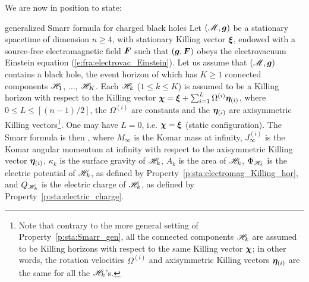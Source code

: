 We are now in position to state:

\begin{tprop}{generalized Smarr formula for charged black holes}{}
Let $(\mathscr{M},\bm{g})$ be a stationary spacetime of dimension $n\geq 4$, with stationary
Killing vector $\bm{\xi}$, endowed with a source-free electromagnetic field
$\bm{F}$ such that $(\bm{g},\bm{F})$ obeys the electrovacuum Einstein equation
(\ref{e:fra:electrovac_Einstein}).
Let us assume that $(\mathscr{M},\bm{g})$ contains a black
hole, the event horizon of which has $K \geq 1$ connected components
$\mathscr{H}_{1}$, $\ldots$, $\mathscr{H}_{K}$. Each $\mathscr{H}_{k}$ ($1\leq k \leq K$)
is assumed to be a Killing horizon with respect to the Killing vector
$\bm{\chi} = \bm{\xi} + \sum_{i=1}^{L} \Omega^{(i)} \bm{\eta}_{(i)}$,
where $0\leq L \leq [(n-1)/2]$, the $\Omega^{(i)}$ are constants and
the $\bm{\eta}_{(i)}$ are axisymmetric Killing vectors\footnote{Note that contrary to the more
general setting of Property~\ref{p:sta:Smarr_gen},
all the connected components $\mathscr{H}_k$ are assumed to be Killing horizons with
respect to the same Killing vector $\bm{\chi}$; in other words, the
rotation velocities
$\Omega^{(i)}$ and axisymmetric Killing vectors $\bm{\eta}_{(i)}$
are the same for all the $\mathscr{H}_k$'s.}. One may have $L=0$,
i.e. $\bm{\chi} = \bm{\xi}$ (static configuration).
The Smarr formula is then
\be \label{e:sta:Smarr_electrovac}
    ,
\ee
where $M_\infty$ is the Komar mass at infinity,
$J_\infty^{(i)}$ is the Komar angular momentum at infinity with respect
to the axisymmetric Killing vector $\bm{\eta}_{(i)}$, $\kappa_k$ is the
surface gravity of $\mathscr{H}_k$, $A_k$ is the area of $\mathscr{H}_k$,
$\Phi_{\mathscr{H}_k}$ is the electric potential of $\mathscr{H}_k$, as defined by
Property~\ref{p:sta:electromag_Killing_hor}, and $Q_{\mathscr{H}_k}$ is the
electric charge of $\mathscr{H}_k$, as defined by Property~\ref{p:sta:electric_charge}.
\end{tprop}


